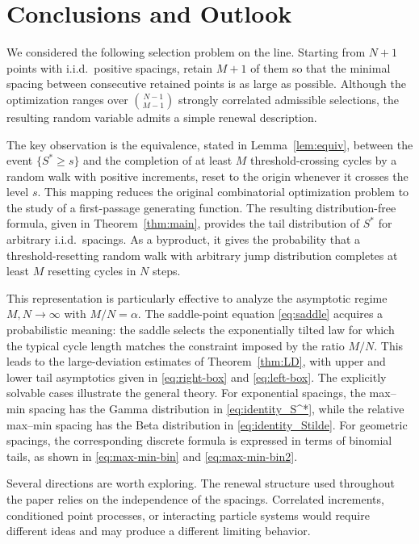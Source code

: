 \documentclass[a4paper,reqno,11pt]{amsart}
\numberwithin{equation}{section}
\numberwithin{thm}{section}
\theoremstyle{plain}
\theoremstyle{definition}
\begin{document}
{\section{Conclusions and Outlook} \label{sec:conclusions}

We considered the following selection problem on the line. Starting from
$N+1$  points with i.i.d.\ positive spacings, retain $M+1$ of them so
that the minimal spacing between consecutive retained points is as large as
possible. Although the optimization ranges over
$\binom{N-1}{M-1}$ strongly correlated admissible selections, the resulting
random variable admits a simple renewal description.


The key observation is the equivalence, stated in Lemma~\ref{lem:equiv},
between the event $\{S^*\geq s\}$ and the completion of at least $M$
threshold-crossing cycles by a random walk with positive increments, reset to
the origin whenever it crosses the level $s$. This mapping reduces the original
combinatorial optimization problem to the study of a
first-passage generating function. The resulting distribution-free formula,
given in Theorem~\ref{thm:main}, provides the tail distribution of $S^*$ for arbitrary i.i.d.\ spacings. As a byproduct, it gives the probability that a threshold-resetting random walk with arbitrary jump distribution completes at least $M$ resetting cycles in $N$ steps.

This representation is particularly effective to analyze the asymptotic regime 
$M,N\to\infty$ with $M/N=\alpha$. The saddle-point equation
\eqref{eq:saddle} acquires a probabilistic meaning: the saddle selects the
exponentially tilted law for which the typical cycle length matches the
constraint imposed by the ratio $M/N$.  This leads to the large-deviation estimates of
Theorem~\ref{thm:LD}, with upper and lower tail asymptotics given in
\eqref{eq:right-box} and \eqref{eq:left-box}. The explicitly solvable cases
illustrate the general theory. For exponential spacings, the max--min spacing
has the Gamma distribution in \eqref{eq:identity_S^*}, while the relative max--min
spacing has the Beta distribution in \eqref{eq:identity_Stilde}. For geometric spacings,
the corresponding discrete formula is expressed in terms of binomial tails, as
shown in \eqref{eq:max-min-bin} and \eqref{eq:max-min-bin2}.

Several directions are worth exploring. The renewal structure used
throughout the paper relies on the independence of the spacings. Correlated
increments, conditioned point processes, or interacting particle systems would
require different ideas and may produce  a different limiting behavior. 


}
\end{document}
